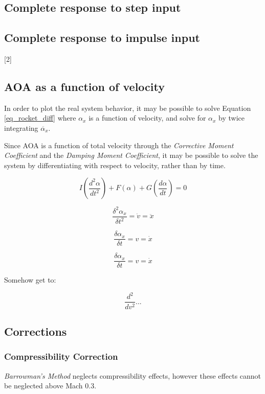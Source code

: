 \documentclass[]{book}
\begin{document}
\subsection{Complete response to step
input}\label{complete-response-to-step-input-1}

\subsection{Complete response to impulse
input}\label{complete-response-to-impulse-input-1}

{[}2{]}

\subsection{AOA as a function of
velocity}\label{aoa-as-a-function-of-velocity}

In order to plot the real system behavior, it may be possible to solve
Equation \ref{eq_rocket_diff} where \(\alpha_x\) is a function of
velocity, and solve for \(\alpha_x\) by twice integrating
\(\ddot{\alpha_x}\).

Since AOA is a function of total velocity through the \emph{Corrective
Moment Coefficient} and the \emph{Damping Moment Coefficient}, it may be
possible to solve the system by differentiating with respect to
velocity, rather than by time.

\[
I \left( \dfrac{d^2\alpha}{dt^2} \right) + F(\alpha) + G \left(\dfrac{d\alpha}{dt} \right) = 0
\]

\[
\dfrac{\delta^2 \alpha_x}{\delta t^2} = \dot{v} = \ddot{x}
\]

\[
\dfrac{\delta \alpha_x}{\delta t} = v = \dot{x}
\]

\[
\dfrac{\delta \alpha_x}{\delta t} = v = \dot{x}
\]

Somehow get to:

\[
\dfrac{d^2}{dv^2} ...
\]

\subsection{Corrections}\label{corrections}

\subsubsection{Compressibility
Correction}\label{compressibility-correction}

\emph{Barrowman's Method} neglects compressibility effects, however
these effects cannot be neglected above Mach 0.3.
\end{document}
